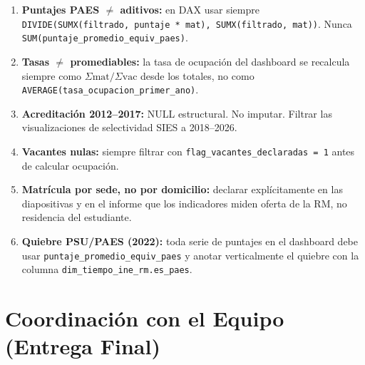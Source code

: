 \documentclass[11pt,a4paper]{article}
\begin{document}
\begin{tcolorbox}[colback=white, colframe=warnred, breakable,
    title=\textbf{\color{warnred}Reglas de Uso Obligatorio — Informe, Dashboard y Defensa Oral}]
\begin{enumerate}[leftmargin=*]
    \item \textbf{Puntajes PAES $\neq$ aditivos:} en DAX usar siempre
          \texttt{DIVIDE(SUMX(filtrado, puntaje * mat), SUMX(filtrado, mat))}.
          Nunca \texttt{SUM(puntaje\_promedio\_equiv\_paes)}.
    \item \textbf{Tasas $\neq$ promediables:} la tasa de ocupación del dashboard
          se recalcula siempre como $\Sigma\text{mat} / \Sigma\text{vac}$ desde los
          totales, no como \texttt{AVERAGE(tasa\_ocupacion\_primer\_ano)}.
    \item \textbf{Acreditación 2012--2017:} NULL estructural. No imputar.
          Filtrar las visualizaciones de selectividad SIES a 2018--2026.
    \item \textbf{Vacantes nulas:} siempre filtrar con
          \texttt{flag\_vacantes\_declaradas = 1} antes de calcular ocupación.
    \item \textbf{Matrícula por sede, no por domicilio:} declarar explícitamente
          en las diapositivas y en el informe que los indicadores miden oferta
          de la RM, no residencia del estudiante.
    \item \textbf{Quiebre PSU/PAES (2022):} toda serie de puntajes en el dashboard
          debe usar \texttt{puntaje\_promedio\_equiv\_paes} y anotar verticalmente
          el quiebre con la columna \texttt{dim\_tiempo\_ine\_rm.es\_paes}.
\end{enumerate}
\end{tcolorbox}

\section{Coordinación con el Equipo (Entrega Final)}
\label{sec:coordinacion}
\end{document}
